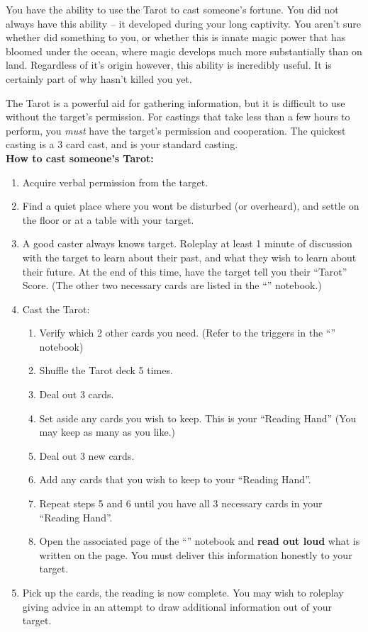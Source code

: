 \documentclass[green]{NeptuneBall}
\begin{document}
\name{\gTreaty{}}

You have the ability to use the Tarot to cast someone's fortune. You did not always have this ability -- it developed during your long captivity. You aren't sure whether \cWitch{\MYname} did something to you, or whether this is innate magic power that has bloomed under the ocean, where magic develops much more substantially than on land. Regardless of it's origin however, this ability is incredibly useful. It is certainly part of why \cWitch{\MYname} hasn't killed you yet.

The Tarot is a powerful aid for gathering information, but it is difficult to use without the target's permission. For castings that take less than a few hours to perform, you \emph{must} have the target's permission and cooperation. The quickest casting is a 3 card cast, and is your standard casting.\\

{\bf How to cast someone's Tarot:} %
\begin{enumerate}
  \item Acquire verbal permission from the target.
  \item Find a quiet place where you wont be disturbed (or overheard), and settle on the floor or at a table with your target.
  \item A good caster always knows \cSlave{\their} target. Roleplay at least 1 minute of discussion with the target to learn about their past, and what they wish to learn about their future. At the end of this time, have the target tell you their ``Tarot'' Score. (The other two necessary cards are listed in the ``\mTarot{\MYname}'' notebook.)
  \item Cast the Tarot:
  \begin{enumerate}
    \item Verify which 2 other cards you need. (Refer to the triggers in the ``\mTarot{\MYname}'' notebook)
    \item Shuffle the Tarot deck 5 times.
    \item Deal out 3 cards.
    \item Set aside any cards you wish to keep. This is your ``Reading Hand'' (You may keep as many as you like.)
    \item Deal out 3 new cards.
    \item Add any cards that you wish to keep to your ``Reading Hand''.
    \item Repeat steps 5 and 6 until you have all 3 necessary cards in your ``Reading Hand''.
    \item Open the associated page of the ``\mTarot{\MYname}'' notebook and {\bf read out loud} what is written on the page. You must deliver this information honestly to your target.
  \end{enumerate}
  \item Pick up the cards, the reading is now complete. You may wish to roleplay giving advice in an attempt to draw additional information out of your target.
\end{enumerate}
\end{document}
